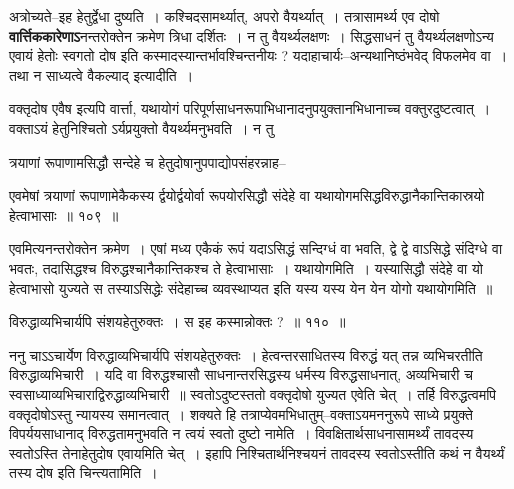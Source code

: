 \documentclass[article,12pt,a4paper]{memoir}
\begin{document}
	  \pstart अत्रोच्यते--इह हेतुर्द्वेधा दुष्यति । कश्चिदसामर्थ्यात्, अपरो वैयर्थ्यात् । तत्रासामर्थ्य एव दोषो \textbf{वार्त्तिककारेणाऽ}नन्तरोक्तेन क्रमेण त्रिधा दर्शितः । न तु वैयर्थ्यलक्षणः । सिद्धसाधनं तु वैयर्थ्यलक्षणोऽन्य एवायं हेतोः स्वगतो दोष इति कस्मादस्यान्तर्भावश्चिन्तनीयः ? यदाहाचार्यः--अन्यथानिष्ठंभवेद् विफलमेव वा । तथा न साध्यत्वे वैकल्याद्  इत्यादीति ।
	\pend
      

	  \pstart वक्तृदोष एवैष इत्यपि वार्त्ता, यथायोगं परिपूर्णसाधनरूपाभिधानादनुपयुक्तानभिधानाच्च वक्तुरदुष्टत्वात् । वक्ताऽयं हेतुनिश्चितो ऽर्यप्रयुक्तो वैयर्थ्यमनुभवति । न तु \leavevmode{} 
	  
	त्रयाणां रूपाणामसिद्धौ सन्देहे च हेतुदोषानुपपाद्योपसंहरन्नाह--  
	  
	एवमेषां त्रयाणां रूपाणामेकैकस्य र्द्वयोर्द्वयोर्वा रूपयोरसिद्धौ संदेहे वा यथायोगमसिद्धविरुद्धानैकान्तिकास्रयो हेत्वाभासाः ॥ १०९ ॥ 
	  
	एवमित्यनन्तरोक्तेन क्रमेण । एषां मध्य एकैकं रूपं यदाऽसिद्धं सन्दिग्धं वा भवति, द्वे द्वे वाऽसिद्धे संदिग्धे वा भवतः, तदासिद्धश्च विरुद्धश्चानैकान्तिकश्च ते हेत्वाभासाः । यथायोगमिति । यस्यासिद्धौ संदेहे वा यो हेत्वाभासो युज्यते स तस्याऽसिद्धेः संदेहाच्च व्यवस्थाप्यत इति यस्य यस्य येन येन योगो यथायोगमिति ॥  
	  
	विरुद्धाव्यभिचार्यपि संशयहेतुरुक्तः । स इह कस्मान्नोक्तः ? ॥ ११० ॥ 
	  
	ननु चाऽऽचार्येण विरुद्धाव्यभिचार्यपि संशयहेतुरुक्तः । हेत्वन्तरसाधितस्य विरुद्धं यत् तन्न व्यभिचरतीति विरुद्धाव्यभिचारी । यदि वा विरुद्धश्चासौ साधनान्तरसिद्धस्य धर्मस्य विरुद्धसाधनात्, अव्यभिचारी च स्वसाध्याव्यभिचाराद्विरुद्धाव्यभिचारी ॥ स्वतोऽदुष्टस्ततो वक्तृदोषो युज्यत एवेति चेत् । तर्हि विरुद्धत्वमपि वक्तृदोषोऽस्तु न्यायस्य समानत्वात् । शक्यते हि तत्राप्येवमभिधातुम्--वक्ताऽयमननुरूपे साध्ये प्रयुक्ते विपर्ययसाधानाद् विरुद्धतामनुभवति न त्वयं स्वतो दुष्टो नामेति । विवक्षितार्थसाधनासामर्थ्यं तावदस्य स्वतोऽस्ति तेनाहेतुदोष एवायमिति चेत् । इहापि निश्चितार्थनिश्चयनं तावदस्य स्वतोऽस्तीति कथं न वैयर्थ्यं तस्य दोष इति चिन्त्यतामिति ।
	\pend
      
\end{document}

